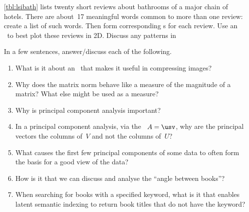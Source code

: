 \begin{exercise} \label{ex:lsibath} 
\cref{tbl:lsibath} lists twenty short reviews about bathrooms of a major chain of hotels.
There are about~17 meaningful words common to more than one review: create a list of such words.
Then form corresponding s for each review.
Use an \svd\ to best plot these reviews in 2D.
Discuss any patterns in 
\end{exercise}







\begin{exercise}  
In a few sentences, answer\slash discuss each of the following.
\begin{enumerate}
\item What is it about an \svd\ that makes it useful in compressing images?

\item Why does the matrix norm behave like a measure of the magnitude of a matrix?  What else might be used as a measure?

\item Why is principal component analysis important?

\item In a principal component analysis, via the \svd\ \(A=\usv\), why are the principal vectors the columns of~\(V\) and not the columns of~\(U\)?

\item What causes the first few principal components of some data to often form the basis for a good view of the data?


\item How is it that we can discuss and analyse the ``angle between books''?

\item When searching for books with a specified keyword, what is it that enables latent semantic indexing to return book titles that do not have the keyword? 


\end{enumerate}
\end{exercise}

\endinput%

